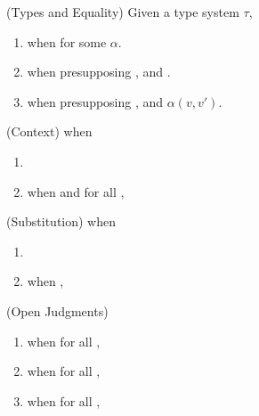 

\begin{definition}(Types and Equality)
  Given a type system $\tau$, 
  \begin{enumerate}
    \item {} when  for some $\alpha$.
    \item {} when presupposing ,
       and .
    \item {} when presupposing ,
       and $\alpha(v,v')$.
  \end{enumerate}
\end{definition}

\begin{definition}(Context)
   when
  \begin{enumerate}
    \item \eqCtx{\cdot}{\cdot}
    \item {} when  and for all 
      , 
  \end{enumerate}
\end{definition}

\begin{definition}(Substitution)
   when
  \begin{enumerate}
    \item \eqInst{\cdot}{\cdot}{\cdot}
    \item {} when
      , 
  \end{enumerate}
\end{definition}

\begin{definition}(Open Judgments)
  \begin{enumerate}
    \item {} when for all , 
    \item {} when for all , 
    \item {} when for all , 
  \end{enumerate}
\end{definition}

